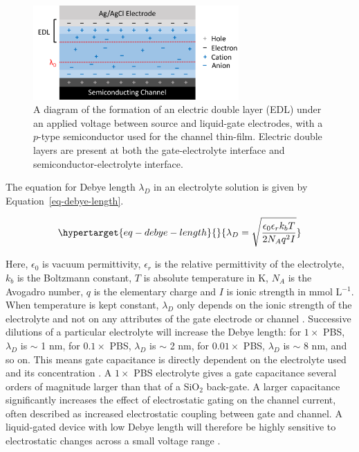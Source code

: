 \documentclass[
  a4paper,
]{scrbook}
\begin{document}
\begin{figure}

{\centering \includegraphics[width=0.7\textwidth,height=\textheight]{figures/ch2/Debye-length-schematic-alt.png}

}

\caption[A diagram of an electric double layer between source and
liquid-gate electrodes.]{\label{fig-Debye-length}A diagram of the
formation of an electric double layer (EDL) under an applied voltage
between source and liquid-gate electrodes, with a \(p\)-type
semiconductor used for the channel thin-film. Electric double layers are
present at both the gate-electrolyte interface and
semiconductor-electrolyte interface.}

\end{figure}

The equation for Debye length \(\lambda_D\) in an electrolyte solution
is given by Equation~\ref{eq-debye-length}.

\begin{equation}\protect\hypertarget{eq-debye-length}{}{
\lambda_D = \sqrt{\frac{\epsilon_0\epsilon_rk_bT}{2N_Aq^2I}}
}\label{eq-debye-length}\end{equation}

Here, \(\epsilon_0\) is vacuum permittivity, \(\epsilon_r\) is the
relative permittivity of the electrolyte, \(k_b\) is the Boltzmann
constant, \(T\) is absolute temperature in K, \(N_A\) is the Avogadro
number, \(q\) is the elementary charge and \(I\) is ionic strength in
mmol L\(^{-1}\). When temperature is kept constant, \(\lambda_D\) only
depends on the ionic strength of the electrolyte and not on any
attributes of the gate electrode or channel
\autocite{Stern2007,Shkodra2021}. Successive dilutions of a particular
electrolyte will increase the Debye length: for \(1 \times\) PBS,
\(\lambda_D\) is \(\sim\) 1 nm, for \(0.1 \times\) PBS, \(\lambda_D\) is
\(\sim\) 2 nm, for \(0.01 \times\) PBS, \(\lambda_D\) is \(\sim\) 8 nm,
and so on. This means gate capacitance is directly dependent on the
electrolyte used and its concentration
\autocite{Kireev2017,Shkodra2021}. A \(1 \times\) PBS electrolyte gives
a gate capacitance several orders of magnitude larger than that of a
SiO\(_2\) back-gate. A larger capacitance significantly increases the
effect of electrostatic gating on the channel current, often described
as increased electrostatic coupling between gate and channel. A
liquid-gated device with low Debye length will therefore be highly
sensitive to electrostatic changes across a small voltage range
\autocite{Heller2010,Ohno2015,Kireev2017,Yao2021}.
\end{document}
